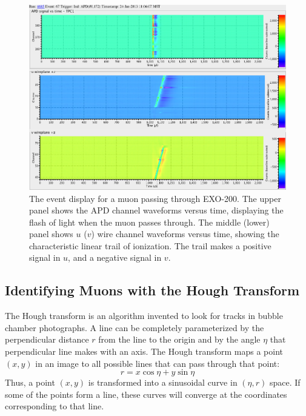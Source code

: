 \documentclass[herrin-thesis.tex]{subfiles}
\begin{document}
\begin{figure}[htp]
\centering
\includegraphics[width=1\columnwidth]{./plots/muon_eventdisplay_run_4685_ev_67.png}
\caption[A muon passing through EXO-200]{The event display for a muon passing through EXO-200. The upper panel shows the APD channel waveforms versus time, displaying the flash of light when the muon passes through. The middle (lower) panel shows \(u\) (\(v\)) wire channel waveforms versus time, showing the characteristic linear trail of ionization. The trail makes a positive signal in \(u\), and a negative signal in \(v\).}
\label{fig:muon:eventdisplay}
\end{figure}

\subsection{Identifying Muons with the Hough Transform}
The Hough transform \cite{Hough:1959fk,Duda:1972:UHT:361237.361242} is an algorithm invented to look for tracks in bubble chamber photographs. A line can be completely parameterized by the perpendicular distance \(r\) from the line to the origin and by the angle \(\eta\) that perpendicular line makes with an axis. The Hough transform maps a point \((x, y)\) in an image to all possible lines that can pass through that point:
\begin{equation}
r = x \cos\eta + y \sin\eta
\end{equation}
Thus, a point \((x, y)\) is transformed into a sinusoidal curve in \((\eta, r)\) space. If some of the points form a line, these curves will converge at the coordinates corresponding to that line.
\end{document}
